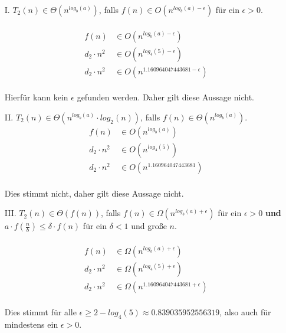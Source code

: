 \documentclass{article}
\begin{document}
   	\begin{enumerate}
   	    \item[I.]
   	    $T_2(n) \in \Theta (n^{log_b(a)})$, falls $f(n) \in O(n^{log_b(a)- \epsilon})$ für ein $\epsilon > 0$.\\
   	    \\
   	    \[
   	        \begin{array}{ll}
   	            f(n) &\in O(n^{log_b(a)- \epsilon})\\
   	            d_2\cdot n^2 &\in O(n^{log_4(5)- \epsilon})\\
   	            d_2\cdot n^2 &\in O(n^{1.160964047443681- \epsilon})
   	        \end{array}
   	    \]
   	    \\
   	    Hierfür kann kein $\epsilon$ gefunden werden. Daher gilt diese Aussage nicht.\\
   	    \item[II.]
   	    $T_2(n) \in \Theta (n^{log_b(a)} \cdot log_2(n))$, falls $f(n) \in \Theta (n^{log_b(a)})$.\\
   	    \[
   	        \begin{array}{ll}
   	            f(n) &\in O(n^{log_b(a)})\\
   	            d_2\cdot n^2 &\in O(n^{log_4(5)})\\
   	            d_2\cdot n^2 &\in O(n^{1.160964047443681})
   	        \end{array}
   	    \]
   	    \\
   	    Dies stimmt nicht, daher gilt diese Aussage nicht.
   	    \item[III.]
   	    $T_2(n) \in \Theta (f(n))$, falls $f(n) \in \Omega (n^{log_b(a)+ \epsilon})$ für ein $\epsilon > 0$ \textbf{und} $a \cdot f(\frac{n}{b}) \leq \delta \cdot f(n)$ für ein $\delta < 1$ und große $n$.\\
   	    \\
   	    \[
   	        \begin{array}{ll}
   	            f(n) &\in \Omega (n^{log_b(a)+ \epsilon})\\
   	            d_2\cdot n^2 &\in \Omega (n^{log_4(5)+ \epsilon})\\
   	            d_2\cdot n^2 &\in \Omega (n^{1.160964047443681+ \epsilon})
   	        \end{array}
   	    \]
   	    \\
   	    Dies stimmt für alle $\epsilon \geq 2-log_4(5) \approx 0.839035952556319$, also auch für mindestens ein $\epsilon > 0$.

\end{enumerate}
\end{document}
